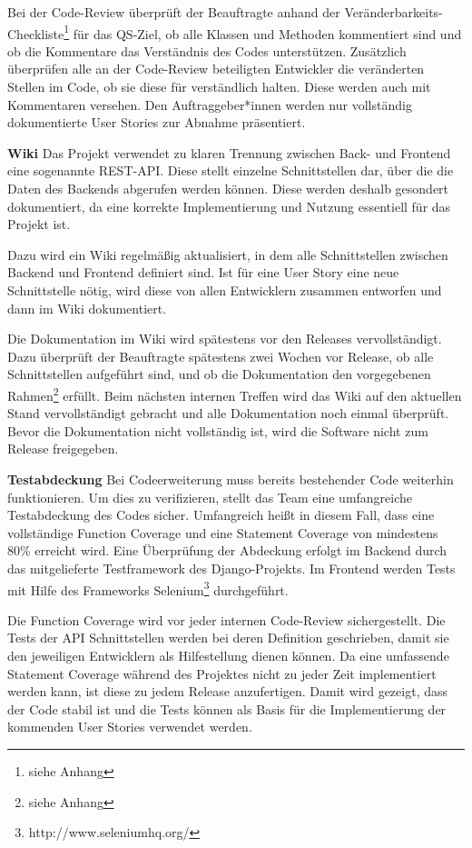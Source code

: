 Bei der Code-Review überprüft der Beauftragte anhand der Veränderbarkeits-Checkliste\footnote{siehe Anhang} für das QS-Ziel, ob alle Klassen und Methoden kommentiert sind und ob die Kommentare das Verständnis des Codes unterstützen. Zusätzlich überprüfen alle an der Code-Review beteiligten Entwickler die veränderten Stellen im Code, ob sie diese für verständlich halten. Diese werden auch mit Kommentaren versehen. Den Auftraggeber*innen werden nur vollständig dokumentierte User Stories zur Abnahme präsentiert.


\textbf{Wiki}
Das Projekt verwendet zu klaren Trennung zwischen Back- und Frontend eine sogenannte REST-API. Diese stellt einzelne Schnittstellen dar, über die die Daten des Backends abgerufen werden können. Diese werden deshalb gesondert dokumentiert, da eine korrekte Implementierung und Nutzung essentiell für das Projekt ist. 

Dazu wird ein Wiki regelmäßig aktualisiert, in dem alle Schnittstellen zwischen Backend und Frontend definiert sind. Ist für eine User Story eine neue Schnittstelle nötig, wird diese von allen Entwicklern zusammen entworfen und dann im Wiki dokumentiert.

Die Dokumentation im Wiki wird spätestens vor den Releases vervollständigt. Dazu überprüft der Beauftragte spätestens zwei Wochen vor Release, ob alle Schnittstellen aufgeführt sind, und ob die Dokumentation den vorgegebenen Rahmen\footnote{siehe Anhang} erfüllt. Beim nächsten internen Treffen wird das Wiki auf den aktuellen Stand vervollständigt gebracht und alle Dokumentation noch einmal überprüft. Bevor die Dokumentation nicht vollständig ist, wird die Software nicht zum Release freigegeben.


\textbf{Testabdeckung}
Bei Codeerweiterung muss bereits bestehender Code weiterhin funktionieren. Um dies zu verifizieren, stellt das Team eine umfangreiche Testabdeckung des Codes sicher. Umfangreich heißt in diesem Fall, dass eine vollständige Function Coverage und eine Statement Coverage von mindestens 80\% erreicht wird. Eine Überprüfung der Abdeckung erfolgt im Backend durch das mitgelieferte Testframework des Django-Projekts. Im Frontend werden Tests mit Hilfe des Frameworks Selenium\footnote{http://www.seleniumhq.org/} durchgeführt.

Die Function Coverage wird vor jeder internen Code-Review sichergestellt. Die Tests der API Schnittstellen werden bei deren Definition geschrieben, damit sie den jeweiligen Entwicklern als Hilfestellung dienen können. Da eine umfassende Statement Coverage während des Projektes nicht zu jeder Zeit implementiert werden kann, ist diese zu jedem Release anzufertigen. Damit wird gezeigt, dass der Code stabil ist und die Tests können als Basis für die Implementierung der kommenden User Stories verwendet werden.


